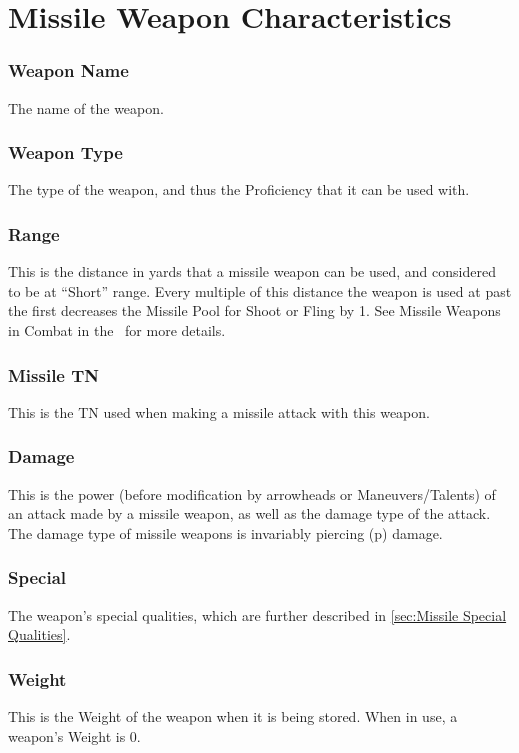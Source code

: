 \documentclass[oneside,11pt,english]{book}
\begin{document}
\section{Missile Weapon Characteristics}
\subsubsection{Weapon Name}
The name of the weapon.

\subsubsection{Weapon Type}
The type of the weapon, and thus the Proficiency that it can be used with. 

\subsubsection{Range}
This is the distance in yards that a missile weapon can be used, and considered to be at “Short” range. 
Every multiple of this distance the weapon is used at past the first decreases the Missile Pool for Shoot or 
Fling by 1. See Missile Weapons in Combat in the ~for more details.  %

\subsubsection{Missile TN}
This is the TN used when making a missile attack with this weapon.

\subsubsection{Damage}
This is the power (before modification by arrowheads or Maneuvers/Talents) of an attack made by a 
missile weapon, as well as the damage type of the attack. The damage type of missile weapons is 
invariably piercing (p) damage. 


\subsubsection{Special}
The weapon’s special qualities, which are further described in \autoref{sec:Missile Special Qualities}.

\subsubsection{Weight}
This is the Weight of the weapon when it is being stored. When in use, a weapon’s Weight is 0. 
\end{document}
